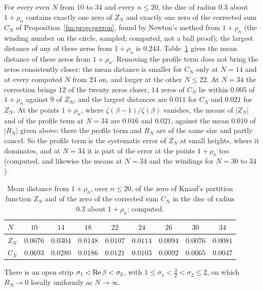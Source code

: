 \begin{resultpar}\label{fm:res:fisher}For every even $N$ from $10$ to $34$ and every $n\le20$, the disc of radius $0.3$ about $1+\rho_n$ contains exactly one zero of $Z_N$ and exactly one zero of the corrected sum $C_N$ of Proposition~\ref{fm:prop:perron}, found by Newton's method from $1+\rho_n$ (the winding number on the circle, sampled; computed, not a ball proof); the largest distance of any of these zeros from $1+\rho_n$ is $0.243$. Table~\ref{fm:tab:fisher} gives the mean distance of these zeros from $1+\rho_n$. Removing the profile term does not bring the zeros consistently closer: the mean distance is smaller for $C_N$ only at $N=14$ and at every computed $N$ from $24$ on, and larger at the other $N\le22$. At $N=34$ the correction brings $12$ of the twenty zeros closer, $14$ zeros of $C_N$ lie within $0.005$ of $1+\rho_n$ against $9$ of $Z_N$, and the largest distances are $0.011$ for $C_N$ and $0.021$ for $Z_N$. At the points $1+\rho_n$, where $\zeta(\beta-1)/\zeta(\beta)$ vanishes, the means of $|Z_N|$ and of the profile term at $N=34$ are $0.016$ and $0.021$, against the mean $0.010$ of $|R_N|$ given above: there the profile term and $R_N$ are of the same size and partly cancel. So the profile term is the systematic error of $Z_N$ at small heights, where it dominates, and at $N=34$ it is part of the error at the points $1+\rho_n$ too (computed, and likewise the means at $N=34$ and the windings for $N=30$ to $34$).\end{resultpar}

\begin{table}[t]
\centering\small
\begin{tabular}{lcccccccc}
\toprule
$N$ & $10$ & $14$ & $18$ & $22$ & $24$ & $26$ & $30$ & $34$\\
\midrule
$Z_N$ & $0.0676$ & $0.0304$ & $0.0148$ & $0.0107$ & $0.0114$ & $0.0094$ & $0.0076$ & $0.0081$\\
$C_N$ & $0.0693$ & $0.0280$ & $0.0186$ & $0.0121$ & $0.0103$ & $0.0092$ & $0.0065$ & $0.0047$\\
\bottomrule
\end{tabular}
\caption{Mean distance from $1+\rho_n$, over $n\le20$, of the zero of Knauf's partition function $Z_N$ and of the zero of the corrected sum $C_N$ in the disc of radius $0.3$ about $1+\rho_n$; computed.}
\label{fm:tab:fisher}
\end{table}

\begin{conjecture}\label{fm:conj:R}
There is an open strip $\sigma_1<\operatorname{Re}\beta<\sigma_2$, with $1\le\sigma_1<\frac32<\sigma_2\le2$, on which $R_N\to0$ locally uniformly as $N\to\infty$.
\end{conjecture}

